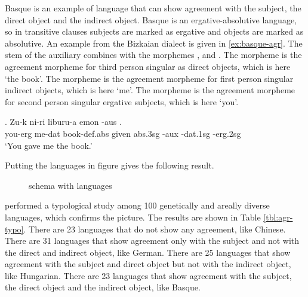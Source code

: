 Basque is an example of language that can show agreement with the subject, the direct object and the indirect object. Basque is an ergative-absolutive language, so in transitive clauses subjects are marked as ergative and objects are marked as absolutive. An example from the Bizkaian dialect is given in \ref{ex:basque-agr}. The stem of the auxiliary  combines with the morphemes ,  and . The morpheme  is the agreement morpheme for third person singular as direct objects, which is here  `the book'. The morpheme  is the agreement morpheme for first person singular indirect objects, which is here  `me'. The morpheme  is the agreement morpheme for second person singular ergative subjects, which is here  `you'.

\exg. Zu-k ni-ri liburu-a emon  -aus  .\\
 you-\ac{erg} me-\ac{dat} book-\ac{def}.\ac{abs} given \ac{abs}.3\ac{sg} -\ac{aux} -\ac{dat}.1\ac{sg} -\ac{erg}.2\ac{sg}\\
 `You gave me the book.' \label{ex:basque-agr}

Putting the languages in  figure gives the following result.

 \begin{figure}[H]
   \centering
   \caption{ schema with languages}
   \label{fig:agr-sub-do-io-lang}
 \end{figure}

\citet{gilligan1987} performed a typological study among 100 genetically and areally diverse languages, which confirms the picture. The results are shown in Table \ref{tbl:agr-typo}. There are 23 languages that do not show any agreement, like Chinese. There are 31 languages that show agreement only with the subject and not with the direct and indirect object, like German. There are 25 languages that show agreement with the subject and direct object but not with the indirect object, like Hungarian. There are 23 languages that show agreement with the subject, the direct object and the indirect object, like Basque.

